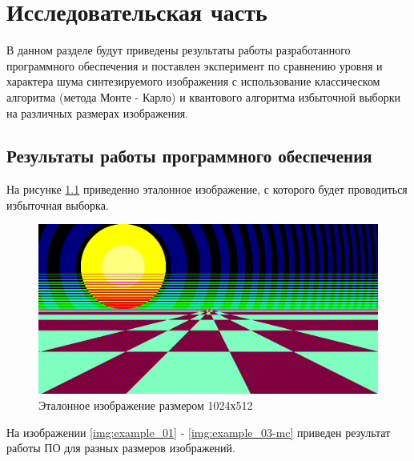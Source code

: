 \chapter{Исследовательская часть}

В данном разделе будут приведены результаты работы разработанного программного обеспечения и поставлен эксперимент по сравнению уровня и характера шума синтезируемого изображения с использование классическом алгоритма (метода Монте - Карло) и квантового алгоритма избыточной выборки на различных размерах изображения.

\section{Результаты работы программного обеспечения}

На рисунке \ref{img:reference} приведенно эталонное изображение, с которого будет проводиться избыточная выборка.

\begin{figure}[H]
	\begin{center}
		\includegraphics[scale=0.48]{img/prog_res/reference-1024.png}
	\end{center}
	\captionsetup{justification=centering}
	\caption{Эталонное изображение размером 1024х512}
	\label{img:reference}
\end{figure}

На изображении \ref{img:example_01} - \ref{img:example_03-mc} приведен результат работы ПО для разных размеров изображений. 

